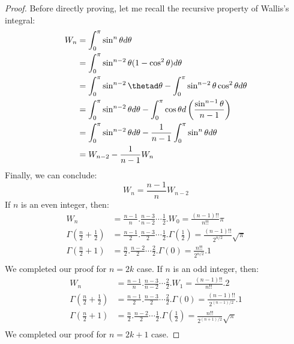 \documentclass[~/PhyAI/phyai.tex]{subfiles}
\begin{document}
\begin{proof}
	Before directly proving, let me recall the recursive property of Wallis's integral:
	\begin{equation*}
		\begin{split}
			W_{n}&=\int_{0 }^{\pi}\sin^{n}\theta d\theta\\&=\int_{0 }^{\pi}\sin^{n-2}\theta (1-\cos^{2}\theta)d\theta\\ &=\int_{0 }^{\pi}\sin^{n-2}\thetad\theta-\int_{0 }^{\pi}\sin^{n-2}\theta\cos^{2}\theta d\theta  \\
			&=\int_{0 }^{\pi}\sin^{n-2}\theta d\theta -\int_{0 }^{\pi}\cos\theta d \left(\frac{\sin^{n-1}\theta }{n-1}\right)\\
			&=\int_{0 }^{\pi}\sin^{n-2}\theta d\theta -\frac{1 }{n-1}\int_{0 }^{\pi}\sin^{n}\theta d\theta \\
			&= W_{n-2}-\frac{1 }{n-1}W_{n}\\
		\end{split}
	\end{equation*}
	Finally, we can conclude:
	$$ W_{n}=\frac{n-1 }{n}W_{n-2} $$
	If $n$ is an even integer, then:
	\begin{equation*}
		\begin{split}
			W_{n}&=\frac{n-1 }{n}.\frac{n-3 }{n-2}\cdots \frac{1 }{2}.W_{0}=\frac{(n-1)!!}{n!!}\pi\\
			\Gamma \left(\frac{n}{2}+\frac{1 }{2}\right)&=\frac{n-1 }{2}.\frac{n-3 }{2}\cdots \frac{1}{2}.\Gamma \left(\frac{1}{2}\right)=\frac{(n-1)!!}{2^{n/2}}\sqrt{\pi}\\
			\Gamma \left(\frac{n }{2}+1\right)&=\frac{n }{2}.\frac{n-2 }{2}\cdots \frac{2 }{2}.\Gamma(0)=\frac{n!! }{2^{n/2}}.1\\
		\end{split}
	\end{equation*}
	We completed our proof for $n=2k$ case. If $ n $ is an odd integer, then:
	\begin{equation*}
		\begin{split}
			W_{n}&=\frac{n-1 }{n}.\frac{n-3 }{n-2}\cdots \frac{2 }{2}.W_{1}=\frac{(n-1)!!}{n!!}.2\\
			\Gamma \left(\frac{n}{2}+\frac{1 }{2}\right)&=\frac{n-1 }{2}.\frac{n-3 }{2}\cdots \frac{2}{2}.\Gamma \left(0\right)=\frac{(n-1)!!}{2^{(n-1)/2}}.1\\
			\Gamma \left(\frac{n }{2}+1\right)&=\frac{n }{2}.\frac{n-2 }{2}\cdots \frac{1 }{2}.\Gamma \left(\frac{1 }{2}\right)=\frac{n!! }{2^{(n+1)/2}}\sqrt{\pi}\\
		\end{split}
	\end{equation*}
	We completed our proof for $n=2k+1$ case.
\end{proof}
\end{document}
